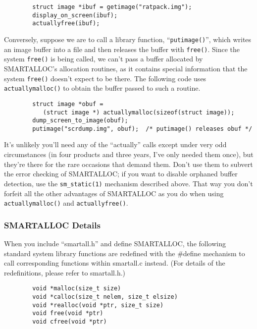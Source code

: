 \footnotesize
\begin{verbatim}
        struct image *ibuf = getimage("ratpack.img");
        display_on_screen(ibuf);
        actuallyfree(ibuf);
\end{verbatim}
\normalsize

Conversely, suppose we are to call a library function, ``{\tt putimage()}'',
which writes an image buffer into a file and then releases the buffer with
{\tt free()}. Since the system {\tt free()} is being called, we can't pass a
buffer allocated by SMARTALLOC's allocation routines, as it contains special
information that the system {\tt free()} doesn't expect to be there. The
following code uses {\tt actuallymalloc()} to obtain the buffer passed to such
a routine. 

\footnotesize
\begin{verbatim}
        struct image *obuf =
           (struct image *) actuallymalloc(sizeof(struct image));
        dump_screen_to_image(obuf);
        putimage("scrdump.img", obuf);  /* putimage() releases obuf */
\end{verbatim}
\normalsize

It's unlikely you'll need any of the ``actually'' calls except under very odd
circumstances (in four products and three years, I've only needed them once),
but they're there for the rare occasions that demand them. Don't use them to
subvert the error checking of SMARTALLOC; if you want to disable orphaned
buffer detection, use the {\tt sm\_static(1)} mechanism described above. That
way you don't forfeit all the other advantages of SMARTALLOC as you do when
using {\tt actuallymalloc()} and {\tt actuallyfree()}. 

\subsubsection*{ SMARTALLOC Details}

When you include ``smartall.h'' and define SMARTALLOC, the following standard
system library functions are redefined with the \#define mechanism to call
corresponding functions within smartall.c instead. (For details of the
redefinitions, please refer to smartall.h.) 

\footnotesize
\begin{verbatim}
        void *malloc(size_t size)
        void *calloc(size_t nelem, size_t elsize)
        void *realloc(void *ptr, size_t size)
        void free(void *ptr)
        void cfree(void *ptr)
\end{verbatim}
\normalsize

